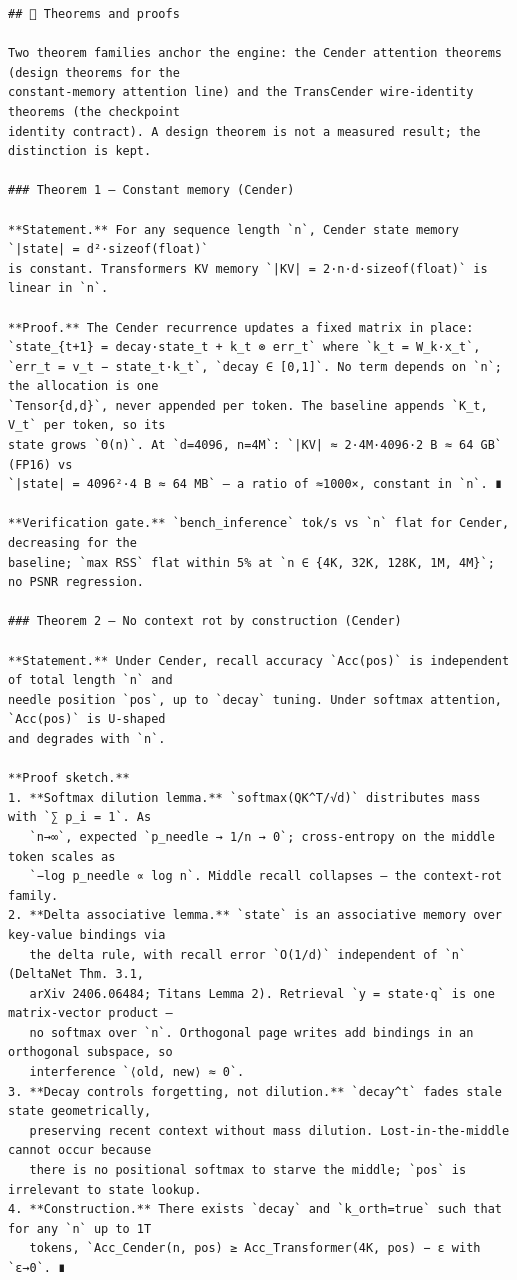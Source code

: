 \begin{Verbatim}[breaklines,breakanywhere,fontsize=\footnotesize]
## 🧪 Theorems and proofs

Two theorem families anchor the engine: the Cender attention theorems (design theorems for the
constant-memory attention line) and the TransCender wire-identity theorems (the checkpoint
identity contract). A design theorem is not a measured result; the distinction is kept.

### Theorem 1 — Constant memory (Cender)

**Statement.** For any sequence length `n`, Cender state memory `|state| = d²·sizeof(float)`
is constant. Transformers KV memory `|KV| = 2·n·d·sizeof(float)` is linear in `n`.

**Proof.** The Cender recurrence updates a fixed matrix in place:
`state_{t+1} = decay·state_t + k_t ⊗ err_t` where `k_t = W_k·x_t`,
`err_t = v_t − state_t·k_t`, `decay ∈ [0,1]`. No term depends on `n`; the allocation is one
`Tensor{d,d}`, never appended per token. The baseline appends `K_t, V_t` per token, so its
state grows `Θ(n)`. At `d=4096, n=4M`: `|KV| ≈ 2·4M·4096·2 B ≈ 64 GB` (FP16) vs
`|state| = 4096²·4 B ≈ 64 MB` — a ratio of ≈1000×, constant in `n`. ∎

**Verification gate.** `bench_inference` tok/s vs `n` flat for Cender, decreasing for the
baseline; `max RSS` flat within 5% at `n ∈ {4K, 32K, 128K, 1M, 4M}`; no PSNR regression.

### Theorem 2 — No context rot by construction (Cender)

**Statement.** Under Cender, recall accuracy `Acc(pos)` is independent of total length `n` and
needle position `pos`, up to `decay` tuning. Under softmax attention, `Acc(pos)` is U-shaped
and degrades with `n`.

**Proof sketch.**
1. **Softmax dilution lemma.** `softmax(QK^T/√d)` distributes mass with `∑ p_i = 1`. As
   `n→∞`, expected `p_needle → 1/n → 0`; cross-entropy on the middle token scales as
   `−log p_needle ∝ log n`. Middle recall collapses — the context-rot family.
2. **Delta associative lemma.** `state` is an associative memory over key-value bindings via
   the delta rule, with recall error `O(1/d)` independent of `n` (DeltaNet Thm. 3.1,
   arXiv 2406.06484; Titans Lemma 2). Retrieval `y = state·q` is one matrix-vector product —
   no softmax over `n`. Orthogonal page writes add bindings in an orthogonal subspace, so
   interference `⟨old, new⟩ ≈ 0`.
3. **Decay controls forgetting, not dilution.** `decay^t` fades stale state geometrically,
   preserving recent context without mass dilution. Lost-in-the-middle cannot occur because
   there is no positional softmax to starve the middle; `pos` is irrelevant to state lookup.
4. **Construction.** There exists `decay` and `k_orth=true` such that for any `n` up to 1T
   tokens, `Acc_Cender(n, pos) ≥ Acc_Transformer(4K, pos) − ε with `ε→0`. ∎


\end{Verbatim}
